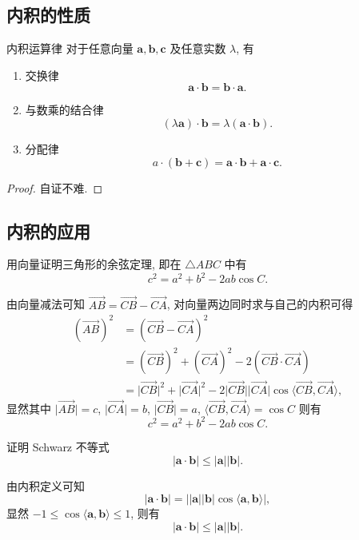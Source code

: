 \documentclass[cn,toc=twocol]{elegantbook}
\newcommand{\ITEMS}{\begin{enumerate}}
\newcommand{\ITEME}{\end{enumerate}}
\newcommand{\ve}[1]{\boldsymbol{#1}}
\newcommand{\Ve}[1]{\overrightarrow{#1}}
\begin{document}
\subsection{内积的性质}

\begin{theorem}{内积运算律} 
对于任意向量 $\ve a, \ve b, \ve c$ 及任意实数 $\lambda$, 有
\ITEMS
	\item 交换律
	\[
		\ve a \cdot \ve b = \ve b \cdot \ve a.
	\]
	\item 与数乘的结合律
	\[
		(\lambda \ve a) \cdot \ve b = \lambda (\ve a \cdot \ve b).
	\]
	\item 分配律
	\[
		a \cdot (\ve b + \ve c) = \ve a \cdot \ve b + \ve a \cdot \ve c.
	\]
\ITEME
\end{theorem}

\begin{proof}
	自证不难.
\end{proof}

\subsection{内积的应用}

\begin{example}
	用向量证明三角形的余弦定理, 即在 $\triangle ABC$ 中有
	\[
		c^2 = a^2 + b^2 - 2ab \cos C. 
	\]
\end{example}

\begin{solution}
	由向量减法可知 $\Ve{AB} = \Ve{CB} - \Ve{CA}$, 对向量两边同时求与自己的内积可得
	\[
		\begin{aligned}
			(\Ve{AB})^2 &= (\Ve{CB} - \Ve{CA})^2\\
			&= (\Ve{CB})^2 + (\Ve{CA})^2 - 2 (\Ve{CB} \cdot  \Ve{CA})\\
			&= \lvert\Ve{CB}\rvert^2 + \lvert\Ve{CA}\rvert^2 - 2 \lvert\Ve{CB}\rvert  \lvert\Ve{CA}\rvert \cos \langle \Ve{CB},\Ve{CA} \rangle,
		\end{aligned}
	\]
	显然其中 $\lvert\Ve{AB}\rvert = c$, $\lvert\Ve{CA}\rvert = b$, $\lvert\Ve{CB}\rvert = a$, $\langle \Ve{CB},\Ve{CA} \rangle = \cos C$ 则有
	\[
		c^2 = a^2 + b^2 - 2ab \cos C. 
	\]
\end{solution}

\begin{example}
	证明 Schwarz 不等式
	\[
		\lvert \ve a \cdot \ve b \rvert \le \lvert \ve a \rvert \lvert \ve b \rvert.
	\]
\end{example}

\begin{solution}
	由内积定义可知
	\[
		\lvert \ve a \cdot \ve b \rvert = \bigl\lvert \lvert\ve a\rvert \lvert \ve b \rvert \cos\langle \ve a, \ve b \rangle \bigr\rvert,
	\]
	显然 $-1 \le \cos\langle \ve a, \ve b \rangle \le 1$, 则有
	\[
		\lvert \ve a \cdot \ve b \rvert \le \lvert \ve a \rvert \lvert \ve b \rvert.
	\]
\end{solution}
\end{document}
